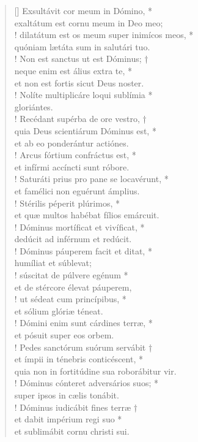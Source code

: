 \begin{verse}[\versewidth]
Exsultávit cor meum in Dómino, *\\
exaltátum est cornu meum in Deo meo;\\!
\vin dilatátum est os meum super inimícos meos, *\\
\vin quóniam lætáta sum in salutári tuo.\\!
Non est sanctus ut est Dóminus; †\\
neque enim est álius extra te, *\\
et non est fortis sicut Deus noster.\\!
\vin Nolíte multiplicáre loqui sublímia *\\
\vin gloriántes.\\!
Recédant supérba de ore vestro, †\\
quia Deus scientiárum Dóminus est, *\\
et ab eo ponderántur actiónes.\\!
\vin Arcus fórtium confráctus est, *\\
\vin et infírmi accíncti sunt róbore.\\!
Saturáti prius pro pane se locavérunt, *\\
et famélici non eguérunt ámplius.\\!
\vin Stérilis péperit plúrimos, *\\
\vin et quæ multos habébat fílios emárcuit.\\!
Dóminus mortíficat et vivíficat, *\\
dedúcit ad inférnum et redúcit.\\!
\vin Dóminus páuperem facit et ditat, *\\
\vin humíliat et súblevat;\\!
súscitat de púlvere egénum *\\
et de stércore élevat páuperem,\\!
\vin ut sédeat cum princípibus, *\\
\vin et sólium glóriæ téneat.\\!
Dómini enim sunt cárdines terræ, *\\
et pósuit super eos orbem.\\!
\vin Pedes sanctórum suórum servábit †\\
\vin et ímpii in ténebris conticéscent, *\\
\vin quia non in fortitúdine sua roborábitur vir.\\!
Dóminus cónteret adversários suos; *\\
super ipsos in cælis tonábit.\\!
\vin Dóminus iudicábit fines terræ †\\
\vin et dabit impérium regi suo *\\
\vin et sublimábit cornu christi sui.\\
\end{verse}
\vspace{1cm}


